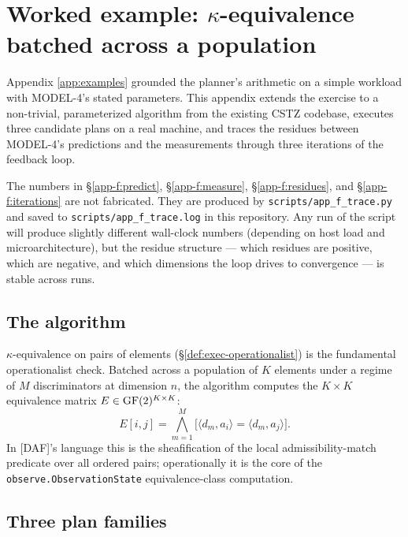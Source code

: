 \section{Worked example: $\kappa$-equivalence batched across a population}
\label{app:feedback-loop}

Appendix \ref{app:examples} grounded the planner's
arithmetic on a simple workload with MODEL-4's stated
parameters. This appendix extends the exercise to a
non-trivial, parameterized algorithm from the existing
CSTZ codebase, executes three candidate plans on a real
machine, and traces the residues between MODEL-4's
predictions and the measurements through three
iterations of the feedback loop.

The numbers in \S\ref{app-f:predict},
\S\ref{app-f:measure}, \S\ref{app-f:residues}, and
\S\ref{app-f:iterations} are not fabricated. They are
produced by \verb|scripts/app_f_trace.py| and saved to
\verb|scripts/app_f_trace.log| in this repository. Any
run of the script will produce slightly different
wall-clock numbers (depending on host load and
microarchitecture), but the residue structure ---
which residues are positive, which are negative, and
which dimensions the loop drives to convergence ---
is stable across runs.

\subsection{The algorithm}\label{app-f:alg}

$\kappa$-equivalence on pairs of elements
(\S\ref{def:exec-operationalist}) is the fundamental
operationalist check. Batched across a population of
$K$ elements under a regime of $M$ discriminators at
dimension $n$, the algorithm computes the $K \times K$
equivalence matrix $E \in \operatorname{GF}(2)^{K \times K}$:
\begin{equation*}
  E[i, j] = \bigwedge_{m=1}^{M} \bigl[\langle d_m, a_i \rangle = \langle d_m, a_j \rangle\bigr].
\end{equation*}
In [DAF]'s language this is the sheafification of the
local admissibility-match predicate over all ordered
pairs; operationally it is the core of the
\texttt{observe.ObservationState} equivalence-class
computation.

\subsection{Three plan families}\label{app-f:families}

